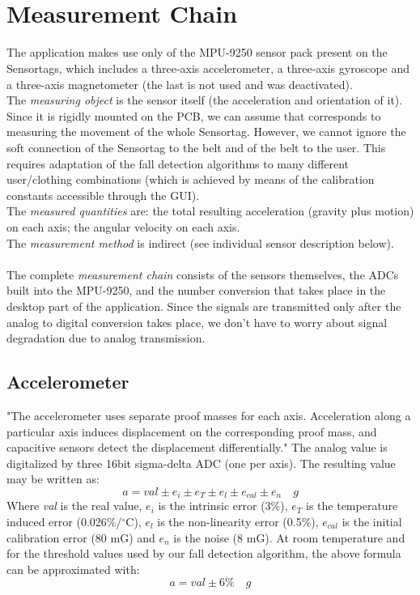 \documentclass[hidelinks,conference,12pt]{IEEETran}
\begin{document}
\section{Measurement Chain\textsuperscript{\cite{prodspec}}}
The application makes use only of the MPU-9250 sensor pack present on the Sensortags, which includes a three-axis accelerometer, a three-axis gyroscope and a three-axis magnetometer (the last is not used and was deactivated).\\
The \textit{measuring object} is the sensor itself (the acceleration and orientation of it). Since it is rigidly mounted on the PCB, we can assume that corresponds to measuring the movement of the whole Sensortag. However, we cannot ignore the soft connection of the Sensortag to the belt and of the belt to the user. This requires adaptation of the fall detection algorithms to many different user/clothing combinations (which is achieved by means of the calibration constants accessible through the GUI).\\
The \textit{measured quantities} are: the total resulting acceleration (gravity plus motion) on each axis; the angular velocity on each axis.\\
The \textit{measurement method} is indirect (see individual sensor description below).\\\\
The complete \textit{measurement chain} consists of the sensors themselves, the ADCs built into the MPU-9250, and the number conversion that takes place in the desktop part of the application. Since the signals are transmitted only after the analog to digital conversion takes place, we don’t have to worry about signal degradation due to analog transmission.

\subsection{Accelerometer}
"The accelerometer uses separate proof masses for each axis. Acceleration along a particular axis induces displacement on the corresponding proof mass, and capacitive sensors detect the displacement differentially." The analog value is digitalized by three 16bit sigma-delta ADC (one per axis). The resulting value may be written as:
$$ a = val \pm e_i \pm e_T \pm e_l \pm e_{cal} \pm e_n \quad g $$
Where \textit{val} is the real value, $e_i$ is the intrinsic error (3\%), $e_T$ is the temperature induced error (0.026\%/$^{\circ}$C), $e_l$ is the non-linearity error (0.5\%), $e_{cal}$ is the initial calibration error (80 mG) and $e_n$ is the noise (8 mG). At room temperature and for the threshold values used by our fall detection algorithm, the above formula can be approximated with:
$$ a = val \pm 6\%  \quad g $$
\end{document}
